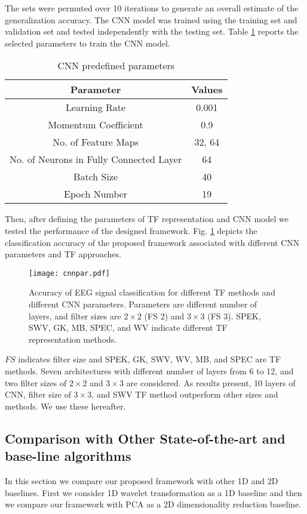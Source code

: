 \documentclass{article}
\begin{document}
The sets were permuted over 10 iterations to generate an overall estimate of the generalization accuracy. The CNN model was trained using the training set and validation set and tested independently with the testing set. 
Table \ref{modpar} reports the selected parameters to train the CNN model. 
\begin{table}[h]
\centering
\caption{CNN predefined parameters}
\label{modpar}
\footnotesize{
\begin{tabular}{cc}
\hline
\textbf{Parameter} &\textbf{Values}  \\\hline
Learning Rate                       & 0.001  \\
Momentum   Coefficient& 0.9    \\
No. of   Feature Maps                     & 32, 64 \\
No. of Neurons in Fully Connected Layer & 64     \\
Batch   Size    & 40     \\
Epoch Number                         & 19  \\\hline
\end{tabular}}
\vspace{-3mm}
\end{table}

\indent Then, after defining the parameters of TF representation and CNN model we tested the performance of the designed framework. Fig. \ref{param} depicts the classification accuracy of the proposed framework 
associated with different CNN parameters and TF approaches.
\begin{figure}[t]
\centerline{\texttt{[image: cnnpar.pdf]}}
\vspace{-3mm}
\caption{\small{Accuracy of EEG signal classification for different TF methods and different CNN parameters. Parameters are different number of layers, and filter sizes are $2\times2$ (FS 2) and $3\times3$ (FS 3). SPEK, SWV, GK, MB, SPEC, and WV indicate different TF representation methods.}}
\vspace{-3mm}
\label{param}
\end{figure}
$FS$ indicates filter size and SPEK, GK, SWV, WV, MB, and SPEC are TF methods. Seven architectures with different number of layers from 6 to 12, and two filter sizes of $2\times2$ and $3\times3$ are considered. As results present, 10 layers of CNN, filter size of $3\times3$, and SWV TF method outperform other sizes and methods. We use these hereafter. 
\vspace{-3mm}
\subsection{Comparison with Other State-of-the-art and base-line algorithms}
\vspace{-1mm}
In this section we compare our proposed framework with other 1D and 2D baselines. First we consider 1D wavelet transformation as a 1D baseline and then we compare our framework with PCA as a 2D dimensionality reduction baseline. 
\vspace{-6pt}
\end{document}
